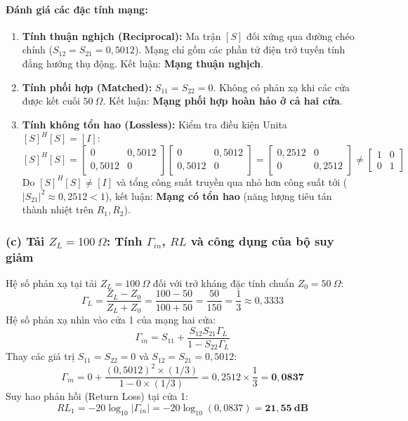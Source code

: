 \documentclass[12pt,a4paper]{article}
\begin{document}
\paragraph{Đánh giá các đặc tính mạng:}
\begin{enumerate}
    \item \textbf{Tính thuận nghịch (Reciprocal):} Ma trận $[S]$ đối xứng qua đường chéo chính ($S_{12} = S_{21} = 0{,}5012$). Mạng chỉ gồm các phần tử điện trở tuyến tính đẳng hướng thụ động. Kết luận: \textbf{Mạng thuận nghịch}.
    \item \textbf{Tính phối hợp (Matched):} $S_{11} = S_{22} = 0$. Không có phản xạ khi các cửa được kết cuối $50~\Omega$. Kết luận: \textbf{Mạng phối hợp hoàn hảo ở cả hai cửa}.
    \item \textbf{Tính không tổn hao (Lossless):} Kiểm tra điều kiện Unita $[S]^H [S] = [I]$:
    \[
    [S]^H [S] = \begin{bmatrix} 0 & 0{,}5012 \\ 0{,}5012 & 0 \end{bmatrix} \begin{bmatrix} 0 & 0{,}5012 \\ 0{,}5012 & 0 \end{bmatrix} = \begin{bmatrix} 0{,}2512 & 0 \\ 0 & 0{,}2512 \end{bmatrix} \neq \begin{bmatrix} 1 & 0 \\ 0 & 1 \end{bmatrix}
    \]
    Do $[S]^H [S] \neq [I]$ và tổng công suất truyền qua nhỏ hơn công suất tới ($|S_{21}|^2 \approx 0{,}2512 < 1$), kết luận: \textbf{Mạng có tổn hao} (năng lượng tiêu tán thành nhiệt trên $R_1, R_2$).
\end{enumerate}

\subsubsection{(c) Tải $Z_L = 100~\Omega$: Tính $\Gamma_{in}$, $RL$ và công dụng của bộ suy giảm}
Hệ số phản xạ tại tải $Z_L = 100~\Omega$ đối với trở kháng đặc tính chuẩn $Z_0 = 50~\Omega$:
\[
\Gamma_L = \frac{Z_L - Z_0}{Z_L + Z_0} = \frac{100 - 50}{100 + 50} = \frac{50}{150} = \frac{1}{3} \approx 0{,}3333
\]
Hệ số phản xạ nhìn vào cửa 1 của mạng hai cửa:
\[
\Gamma_{in} = S_{11} + \frac{S_{12}S_{21}\Gamma_L}{1 - S_{22}\Gamma_L}
\]
Thay các giá trị $S_{11} = S_{22} = 0$ và $S_{12} = S_{21} = 0{,}5012$:
\[
\Gamma_{in} = 0 + \frac{(0{,}5012)^2 \times (1/3)}{1 - 0 \times (1/3)} = 0{,}2512 \times \frac{1}{3} = \mathbf{0{,}0837}
\]
Suy hao phản hồi (Return Loss) tại cửa 1:
\[
RL_1 = -20 \log_{10} |\Gamma_{in}| = -20 \log_{10}(0{,}0837) = \mathbf{21{,}55~\text{dB}}
\]
\end{document}
